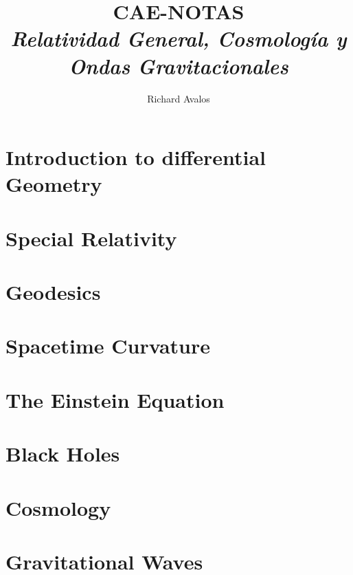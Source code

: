 \documentclass[11pt]{article}
\begin{document}
	\title{{CAE-NOTAS}\\{\normalsize{\itshape Relatividad General, Cosmología y Ondas Gravitacionales}}}
	\author{Richard Avalos}
	\maketitle
	\newpage
 
	\pagestyle{fancynotes}

        \part{Introduction to differential Geometry}
        
        \clearpage
        
        \part{Special Relativity}
        
        \clearpage

        \part{Geodesics}
        
        \clearpage

        \part{Spacetime Curvature}
        
        \clearpage

        \part{The Einstein Equation}
        
        \clearpage

        \part{Black Holes}
        
        \clearpage

        \part{Cosmology}
        
        \clearpage

        \part{Gravitational Waves}
        
\end{document}
